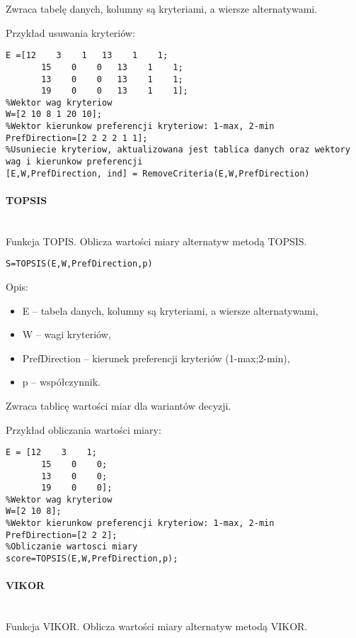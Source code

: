 Zwraca tabelę danych, kolumny są kryteriami, a wiersze alternatywami.

Przykład usuwania kryteriów:
\begin{lstlisting}[style=Matlab-editor]
%Tablica danych
E =[12    3    1   13    1    1;
       15    0    0   13    1    1;
       13    0    0   13    1    1;
       19    0    0   13    1    1];
%Wektor wag kryteriow
W=[2 10 8 1 20 10];
%Wektor kierunkow preferencji kryteriow: 1-max, 2-min
PrefDirection=[2 2 2 2 1 1];
%Usuniecie kryteriow, aktualizowana jest tablica danych oraz wektory wag i kierunkow preferencji
[E,W,PrefDirection, ind] = RemoveCriteria(E,W,PrefDirection)
\end{lstlisting}

\paragraph{TOPSIS} \hspace{0pt} \\
Funkcja TOPIS. Oblicza wartości miary alternatyw metodą TOPSIS.

\begin{lstlisting}[style=Matlab-editor]
S=TOPSIS(E,W,PrefDirection,p)
\end{lstlisting}

Opis:
\begin{itemize}
\item E -- tabela danych, kolumny są kryteriami, a wiersze alternatywami,
\item W -- wagi kryteriów,
\item PrefDirection -- kierunek preferencji kryteriów (1-max;2-min),
\item p -- współczynnik.
\end{itemize}

Zwraca tablicę wartości miar dla wariantów decyzji.

Przykład obliczania wartości miary:
\begin{lstlisting}[style=Matlab-editor]
%Tablica danych
E = [12    3    1;
       15    0    0;
       13    0    0;
       19    0    0];
%Wektor wag kryteriow
W=[2 10 8];
%Wektor kierunkow preferencji kryteriow: 1-max, 2-min
PrefDirection=[2 2 2];
%Obliczanie wartosci miary
score=TOPSIS(E,W,PrefDirection,p);
\end{lstlisting}

\paragraph{VIKOR} \hspace{0pt} \\
Funkcja VIKOR. Oblicza wartości miary alternatyw metodą VIKOR.

